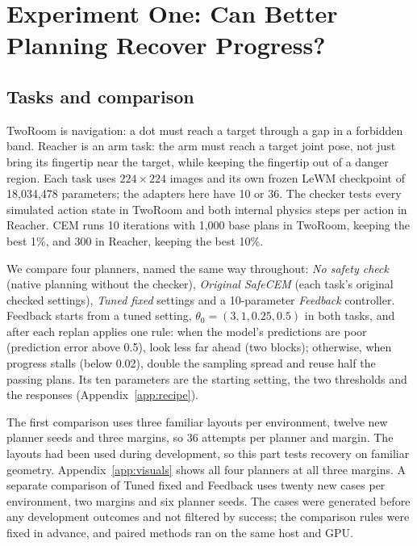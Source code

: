 \documentclass[sigconf,nonacm]{acmart}
\begin{document}
\section{Experiment One: Can Better Planning Recover Progress?}\label{sec:exp1}
\subsection{Tasks and comparison}
TwoRoom is navigation: a dot must reach a target through a gap in a
forbidden band. Reacher is an arm task: the arm must reach a target joint
pose, not just bring its fingertip near the target, while keeping the
fingertip out of a danger region. Each task uses $224\times224$ images and
its own frozen LeWM checkpoint of 18,034,478 parameters; the adapters here
have 10 or 36. The checker tests every simulated action state in TwoRoom and
both internal physics steps per action in Reacher. CEM runs 10 iterations
with 1,000 base plans in TwoRoom, keeping the best 1\%, and 300 in Reacher,
keeping the best 10\%.

We compare four planners, named the same way throughout: \emph{No safety
check} (native planning without the checker), \emph{Original SafeCEM} (each
task's original checked settings), \emph{Tuned fixed} settings and a
10-parameter \emph{Feedback} controller. Feedback starts from a tuned
setting, $\theta_0=(3,1,0.25,0.5)$ in both tasks, and after each replan
applies one rule: when the model's predictions are poor (prediction error
above 0.5), look less far ahead (two blocks); otherwise, when progress
stalls (below 0.02), double the sampling spread and reuse half the passing
plans. Its ten parameters are the starting setting, the two thresholds and
the responses (Appendix~\ref{app:recipe}).

The first comparison uses three familiar layouts per environment, twelve new
planner seeds and three margins, so 36 attempts per planner and margin. The
layouts had been used during development, so this part tests recovery on
familiar geometry. Appendix~\ref{app:visuals} shows all four planners at all
three margins. A separate comparison of Tuned fixed and Feedback uses twenty
new cases per environment, two margins and six planner seeds. The cases
were generated before any development outcomes and not filtered by success;
the comparison rules were fixed in advance, and paired methods ran on the
same host and GPU.
\end{document}
